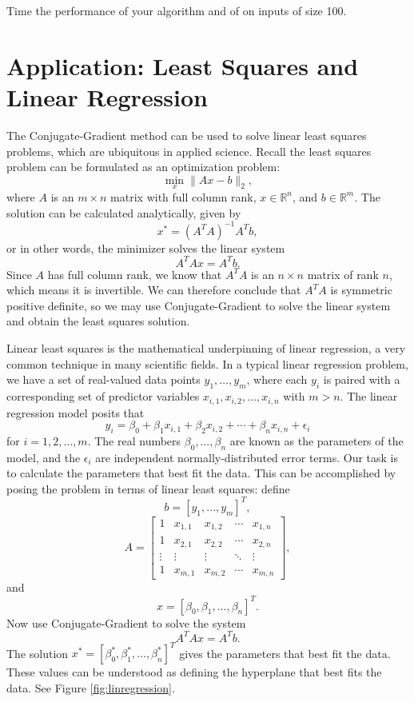 Time the performance of your algorithm and of  on inputs of size 100.

\section*{Application: Least Squares and Linear Regression}
The Conjugate-Gradient method can be used to solve linear least squares problems, which are ubiquitous in applied science.
Recall the least squares problem can be formulated as an optimization problem:
$$
\min_x \|Ax - b\|_2,
$$
where $A$ is an $m \times n$ matrix with full column rank, $x \in \mathbb{R}^n$, and $b \in \mathbb{R}^m$. The solution can
be calculated analytically, given by
$$
x^* = (A^TA)^{-1}A^Tb,
$$
or in other words, the minimizer solves the linear system
$$
A^TAx = A^Tb.
$$
Since $A$ has full column rank, we know that $A^TA$ is an $n \times n$ matrix of rank $n$, which means it is invertible. We can
therefore conclude that $A^TA$ is symmetric positive definite, so we may use Conjugate-Gradient to solve the linear system
and obtain the least squares solution.

Linear least squares is the mathematical underpinning of linear regression, a very common technique in many scientific fields.
In a typical linear regression problem, we have a set of real-valued data points $y_1,\ldots, y_m$, where each
$y_i$ is paired with a corresponding set of predictor variables $x_{i,1}, x_{i,2}, \ldots, x_{i,n}$ with $m > n$.
The linear regression model posits that
$$
y_i = \beta_0 + \beta_1x_{i,1} + \beta_2x_{i,2} + \cdots + \beta_nx_{i,n} + \epsilon_i
$$
for $i = 1, 2, \ldots, m$. The real numbers $\beta_0,\ldots,\beta_n$ are known as the parameters of the model, and the
$\epsilon_i$ are independent normally-distributed error terms. Our task is to calculate the parameters that best fit the data.
This can be accomplished by posing the problem in terms of linear least squares: define
$$
b = [y_1, \ldots, y_m]^T,
$$
$$
A =
\begin{bmatrix}
1 & x_{1,1} & x_{1,2} & \cdots & x_{1,n}\\
1 & x_{2,1} & x_{2,2} & \cdots & x_{2,n}\\
\vdots & \vdots & \vdots & \ddots & \vdots\\
1 & x_{m,1} & x_{m,2} & \cdots & x_{m,n}
\end{bmatrix},
$$
and
$$
x = [\beta_0, \beta_1,\ldots, \beta_n]^T.
$$
Now use Conjugate-Gradient to solve the system
$$
A^TAx = A^Tb.
$$
The solution $x^* = [\beta_0^*, \beta_1^*, \ldots, \beta_n^*]^T$ gives the parameters that best fit the data.
These values can be understood as defining the hyperplane that best fits the data. See Figure \ref{fig:linregression}.

